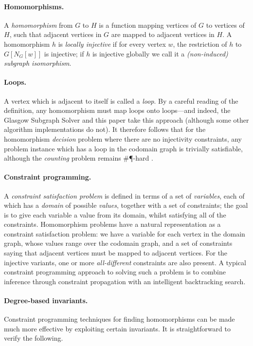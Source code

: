 \documentclass{article}
\begin{document}
\paragraph{Homomorphisms.} A \emph{homomorphism} from $G$ to $H$ is a function mapping vertices of
$G$ to vertices of $H$, such that adjacent vertices in $G$ are mapped to adjacent vertices in $H$. A
homomorphism $h$ is \emph{locally injective} if for every vertex $w$, the restriction of $h$ to
$G[N_G[w]]$ is injective; if $h$ is injective globally we call it a \emph{(non-induced) subgraph
isomorphism}.

\paragraph{Loops.} A vertex which is adjacent to itself is called a \emph{loop}. By a careful reading
of the definition, any homomorphism must map loops onto loops---and indeed, the Glasgow Subgraph
Solver and this paper take this approach (although some other algorithm implementations do not). It
therefore follows that for the homomorphism \emph{decision} problem where there are no injectivity
constraints, any problem instance which has a loop in the codomain graph is trivially satisfiable,
although the \emph{counting} problem remains \#\P-hard \cite{DBLP:journals/rsa/DyerG00}.

\paragraph{Constraint programming.} A \emph{constraint satisfaction problem} is defined in terms of
a set of \emph{variables}, each of which has a \emph{domain} of possible \emph{values}, together
with a set of constraints; the goal is to give each variable a value from its domain, whilst
satisfying all of the constraints. Homomorphism problems have a natural representation as a
constraint satisfaction problem: we have a variable for each vertex in the domain graph, whose
values range over the codomain graph, and a set of constraints saying that adjacent vertices must be
mapped to adjacent vertices. For the injective variants, one or more \emph{all-different}
constraints are also present. A typical constraint programming approach to solving such a problem is
to combine inference through constraint propagation with an intelligent backtracking search.

\paragraph{Degree-based invariants.} Constraint programming techniques for finding
homomorphisms can be made much more effective by exploiting certain invariants. It is
straightforward to verify the following.
\end{document}
